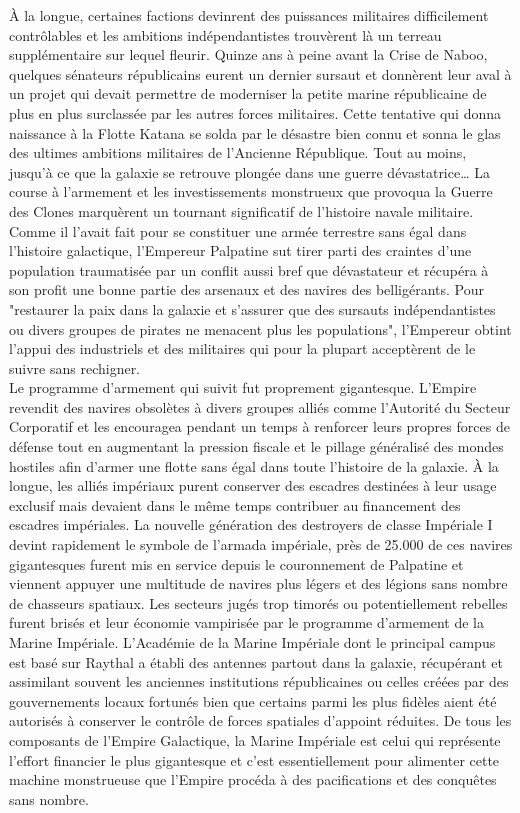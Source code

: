 \documentclass[twoside]{article}
\begin{document}
À la longue, certaines factions devinrent des puissances militaires difficilement contrôlables et les ambitions indépendantistes trouvèrent là un terreau supplémentaire sur lequel fleurir. Quinze ans à peine avant la Crise de Naboo, quelques sénateurs républicains eurent un dernier sursaut et donnèrent leur aval à un projet qui devait permettre de moderniser la petite marine républicaine de plus en plus surclassée par les autres forces militaires. Cette tentative qui donna naissance à la Flotte Katana se solda par le désastre bien connu et sonna le glas des ultimes ambitions militaires de l'Ancienne République. Tout au moins, jusqu'à ce que la galaxie se retrouve plongée dans une guerre dévastatrice\ldots
La course à l'armement et les investissements monstrueux que provoqua la Guerre des Clones marquèrent un tournant significatif de l'histoire navale militaire. Comme il l'avait fait pour se constituer une armée terrestre sans égal dans l'histoire galactique, l'Empereur Palpatine sut tirer parti des craintes d'une population traumatisée par un conflit aussi bref que dévastateur et récupéra à son profit une bonne partie des arsenaux et des navires des belligérants. Pour "restaurer la paix dans la galaxie et s'assurer que des sursauts indépendantistes ou divers groupes de pirates ne menacent plus les populations", l'Empereur obtint l'appui des industriels et des militaires qui pour la plupart acceptèrent de le suivre sans rechigner.\\

Le programme d'armement qui suivit fut proprement gigantesque. L'Empire revendit des navires obsolètes à divers groupes alliés comme l'Autorité du Secteur Corporatif et les encouragea pendant un temps à renforcer leurs propres forces de défense tout en augmentant la pression fiscale et le pillage généralisé des mondes hostiles afin d'armer une flotte sans égal dans toute l'histoire de la galaxie. À la longue, les alliés impériaux purent conserver des escadres destinées à leur usage exclusif mais devaient dans le même temps contribuer au financement des escadres impériales. La nouvelle génération des destroyers de classe Impériale I devint rapidement le symbole de l'armada impériale, près de 25.000 de ces navires gigantesques furent mis en service depuis le couronnement de Palpatine et viennent appuyer une multitude de navires plus légers et des légions sans nombre de chasseurs spatiaux. Les secteurs jugés trop timorés ou potentiellement rebelles furent brisés et leur économie vampirisée par le programme d'armement de la Marine Impériale. L'Académie de la Marine Impériale dont le principal campus est basé sur Raythal a établi des antennes partout dans la galaxie, récupérant et assimilant souvent les anciennes institutions républicaines ou celles créées par des gouvernements locaux fortunés bien que certains parmi les plus fidèles aient été autorisés à conserver le contrôle de forces spatiales d'appoint réduites.
De tous les composants de l'Empire Galactique, la Marine Impériale est celui qui représente l'effort financier le plus gigantesque et c'est essentiellement pour alimenter cette machine monstrueuse que l'Empire procéda à des pacifications et des conquêtes sans nombre.\\
\end{document}
